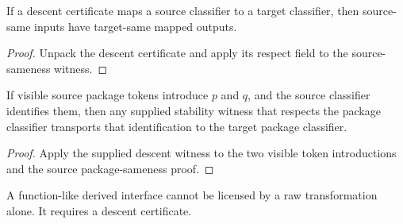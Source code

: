 \begin{theorem}
\label{thm:descent-certificate-respects}
If a descent certificate maps a source classifier to a target classifier, then source-same inputs have target-same mapped outputs.
\end{theorem}

\begin{proof}
Unpack the descent certificate and apply its respect field to the source-sameness witness.
\end{proof}

\begin{theorem}
\label{thm:stable-transformations-descend-to-packages}
If visible source package tokens introduce \(p\) and \(q\), and the source classifier identifies them, then any supplied stability witness that respects the package classifier transports that identification to the target package classifier.
\end{theorem}

\begin{proof}
Apply the supplied descent witness to the two visible token introductions and the source package-sameness proof.
\end{proof}

\begin{corollary}
\label{thm:function-like-interfaces-require-descent}
A function-like derived interface cannot be licensed by a raw transformation alone. It requires a descent certificate.
\end{corollary}


